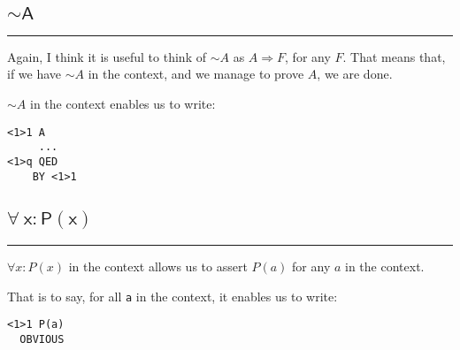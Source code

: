 \documentclass{article}
\newcommand{\code}[1]{\mathsf{#1}}
\begin{document}
\subsection{$\code{\sim A}$}
\hrule
\vspace{10pt}
\begin{minipage}{230pt}
Again, I think it is useful to think of $\sim A$ as $A \Rightarrow F$,
for any $F$. That means that, if we have $\sim A$ in the context, and 
we manage to prove $A$, we are done. \\

\vspace{5pt}

$\sim A$ in the context enables us to write:
\end{minipage}
%
\hspace{15pt} \vline \hspace{15pt}
%
\begin{minipage}{80pt}
\begin{verbatim}
<1>1 A
     ...
<1>q QED
    BY <1>1
\end{verbatim}
\vspace{5pt}
\end{minipage}


\subsection{$\code{\forall\ x : P(x)}$}
\hrule
\vspace{10pt}
\begin{minipage}{230pt}
$\forall x : P(x)$ in the context allows us to assert $P(a)$ for 
any $a$ in the context.
\vspace{5pt}

That is to say, for all \verb|a| in the context, it enables us to write:
\end{minipage}
%
\hspace{15pt} \vline \hspace{15pt}
%
\begin{minipage}{80pt}
\begin{verbatim}
<1>1 P(a)
  OBVIOUS
\end{verbatim}
\vspace{5pt}
\end{minipage}
\end{document}
